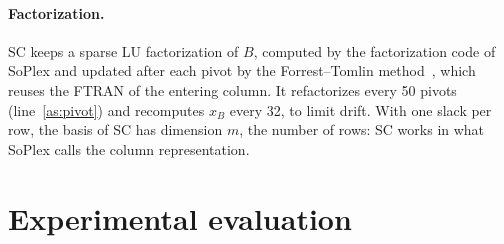 \documentclass[11pt]{article}
\theoremstyle{definition}
\theoremstyle{remark}
\begin{document}
\paragraph{Factorization.} SC keeps a sparse LU factorization of $B$, computed by the factorization code
of SoPlex and updated after each pivot by the Forrest--Tomlin
method~\cite{forrest1972updated}, which reuses the FTRAN of the entering column.
It refactorizes every 50 pivots (line~\ref{as:pivot}) and recomputes $x_B$
every 32, to limit drift.
With one slack per row, the basis of SC has dimension $m$, the number of rows:
SC works in what SoPlex calls the column representation.


\section{Experimental evaluation}\label{sec:experiments}
\end{document}
